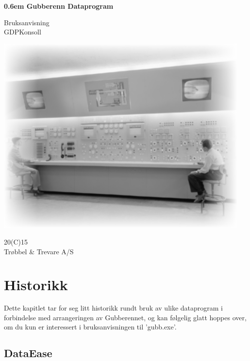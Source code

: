 \documentclass[12pt]{book}
\begin{document}
\clearpage

\newcommand\nbvspace[1][3]{\vspace*{\stretch{#1}}}
\newcommand\nbstretchyspace{\spaceskip0.5em plus 0.25em minus 0.25em}
\newcommand{\nbtitlestretch}{\spaceskip0.6em}
\pagestyle{empty}
\begin{center}
\bfseries
\nbvspace[1]
\Huge
{\nbtitlestretch\huge
Gubberenn Dataprogram \\}

\nbvspace[10]
\normalsize

Bruksanvisning\\
GDPKonsoll\\

\nbvspace[2]

\includegraphics[width=5.0in]{gubb}
\nbvspace[15]
\normalsize

20(C)15\\
\large
Trøbbel \& Trevare A/S
\nbvspace[1]
\end{center}

\tableofcontents

\chapter{Historikk}

Dette kapitlet tar for seg litt historikk rundt bruk av ulike dataprogram i 
forbindelse med arrangeringen av Gubberennet, og kan følgelig 
glatt hoppes over, om du kun er interessert i bruksanvisningen til 'gubb.exe'. 

\section{DataEase}
\end{document}
